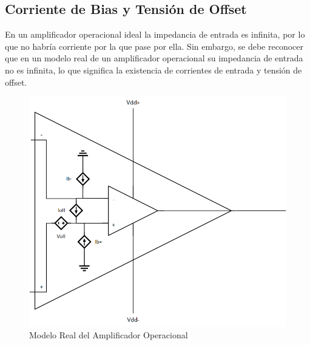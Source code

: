 \subsection{Corriente de Bias y Tensión de Offset}

En un amplificador operacional ideal la impedancia de entrada es infinita, por lo que no habría corriente por la que pase por ella. Sin embargo, se debe reconocer que en un modelo real de un amplificador operacional su impedancia de entrada no es infinita, lo que significa la existencia de corrientes de entrada y tensión de offset. 

\begin{figure}[h]
    \centering
    \includegraphics[scale = 0.4]{../Ejercicio2-MediciondeBias/Informe/modeloopamp.png}
    \caption{Modelo Real del Amplificador Operacional}
    \label{ej2opamp}
\end{figure}

